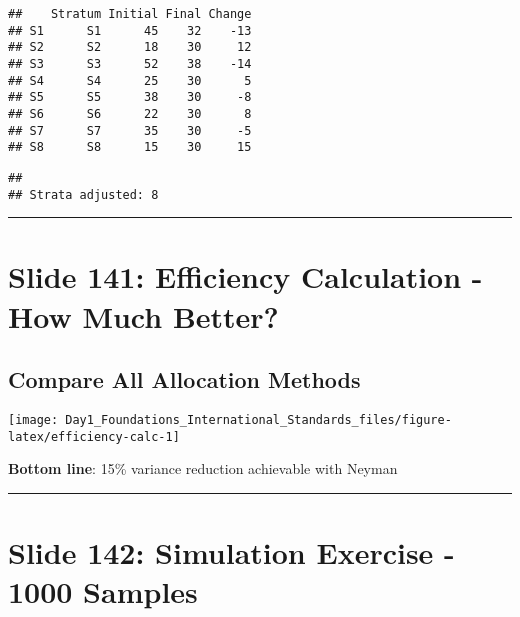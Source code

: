 \documentclass[
]{article}
\newenvironment{Shaded}{\begin{snugshade}}{\end{snugshade}}
\newcommand{\DecValTok}[1]{\textcolor[rgb]{0.00,0.00,0.81}{#1}}
\newcommand{\FunctionTok}[1]{\textcolor[rgb]{0.13,0.29,0.53}{\textbf{#1}}}
\newcommand{\NormalTok}[1]{#1}
\newcommand{\SpecialCharTok}[1]{\textcolor[rgb]{0.81,0.36,0.00}{\textbf{#1}}}
\newcommand{\StringTok}[1]{\textcolor[rgb]{0.31,0.60,0.02}{#1}}
\begin{document}
\begin{verbatim}
##    Stratum Initial Final Change
## S1      S1      45    32    -13
## S2      S2      18    30     12
## S3      S3      52    38    -14
## S4      S4      25    30      5
## S5      S5      38    30     -8
## S6      S6      22    30      8
## S7      S7      35    30     -5
## S8      S8      15    30     15
\end{verbatim}

\begin{Shaded}
\end{Shaded}

\begin{verbatim}
## 
## Strata adjusted: 8
\end{verbatim}

\begin{center}\rule{0.5\linewidth}{0.5pt}\end{center}

\section{Slide 141: Efficiency Calculation - How Much
Better?}\label{slide-141-efficiency-calculation---how-much-better}

\subsection{Compare All Allocation
Methods}\label{compare-all-allocation-methods}

\texttt{[image: Day1\_Foundations\_International\_Standards\_files/figure-latex/efficiency-calc-1]}

\textbf{Bottom line}: 15\% variance reduction achievable with Neyman

\begin{center}\rule{0.5\linewidth}{0.5pt}\end{center}

\section{Slide 142: Simulation Exercise - 1000
Samples}\label{slide-142-simulation-exercise---1000-samples}
\end{document}
